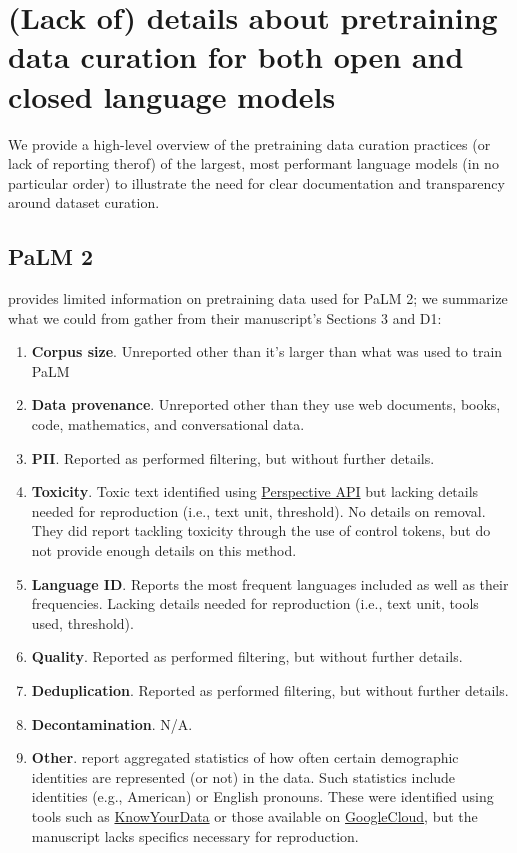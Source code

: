 \section{(Lack of) details about pretraining data curation for both open and closed language models}
\label{sec:pretrain-data-llms}

We provide a high-level overview of the pretraining data curation practices (or lack of reporting therof) of the largest, most performant language models (in no particular order) to illustrate the need for clear documentation and transparency around dataset curation.


\subsection{PaLM 2~\citep{Anil2023PaLM2T}}\label{appendix:llm:palm2} 

\citet{Anil2023PaLM2T} provides limited information on pretraining data used for PaLM 2; we summarize what we could from gather from their manuscript's Sections 3 and D1:

\begin{enumerate}
    \item \textbf{Corpus size}. Unreported other than it's larger than what was used to train PaLM~\citep{Chowdhery2022PaLMSL}
    \item \textbf{Data provenance}. Unreported other than they use web documents, books, code, mathematics, and conversational data. 
    \item \textbf{PII}. Reported as performed filtering, but without further details.
    \item \textbf{Toxicity}. Toxic text identified using \href{https://perspectiveapi.com/}{Perspective API} but lacking details needed for reproduction (i.e., text unit, threshold). No details on removal. They did report tackling toxicity through the use of control tokens, but do not provide enough details on this method.
    \item \textbf{Language ID}. Reports the most frequent languages included as well as their frequencies. Lacking details needed for reproduction (i.e., text unit, tools used, threshold).
    \item \textbf{Quality}.  Reported as performed filtering, but without further details.
    \item \textbf{Deduplication}. Reported as performed filtering, but without further details.
    \item \textbf{Decontamination}. N/A.
    \item \textbf{Other}. \citet{Anil2023PaLM2T} report aggregated statistics of how often certain demographic identities are represented (or not) in the data. Such statistics include identities (e.g., American) or English pronouns. These were identified using tools such as \href{https://knowyourdata.withgoogle.com/}{KnowYourData} or those available on \href{https://cloud.google.com/natural-language/docs/classifying-text}{GoogleCloud}, but the manuscript lacks specifics necessary for reproduction.
\end{enumerate}




